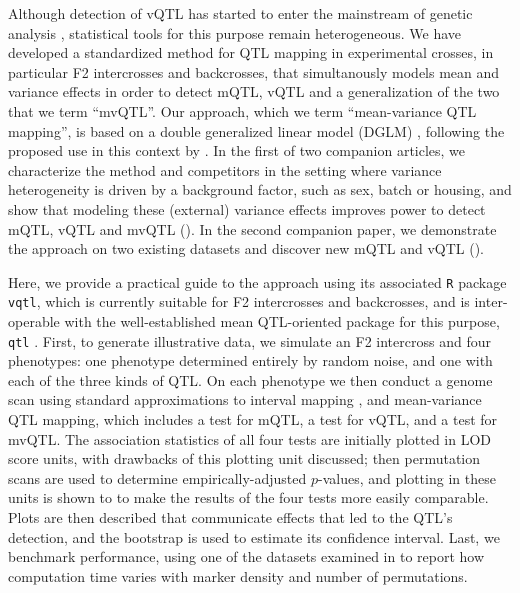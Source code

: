 \documentclass[9pt,twocolumn,twoside]{gsag3jnl}
\begin{document}
Although detection of vQTL has started to enter the mainstream of genetic analysis \citep{Yang2012,Hulse2013,Ayroles2015,Forsberg2015,Wei2016-lt,Wang2017,Wei2017-tt}, statistical tools for this purpose remain heterogeneous.
We have developed a standardized method for QTL mapping in experimental crosses, in particular F2 intercrosses and backcrosses, that simultanously models mean and variance effects in order to detect mQTL, vQTL and a generalization of the two that we term ``mvQTL''.
Our approach, which we term ``mean-variance QTL mapping'', is based on a double generalized linear model (DGLM) \citep{Smyth1989}, following the proposed use in this context by \citet{Ronnegard2011a}.
In the first of two companion articles, we characterize the method and competitors in the setting where variance heterogeneity is driven by a background factor, such as sex, batch or housing, and show that modeling these (external) variance effects improves power to detect mQTL, vQTL and mvQTL (\CortyMethodsPaper). 
In the second companion paper, we demonstrate the approach on two existing datasets and discover new mQTL and vQTL (\CortyReanalysisPaper). 

Here, we provide a practical guide to the approach using its associated \texttt{R} package \texttt{vqtl},
%
%
which is currently suitable for F2 intercrosses and backcrosses, and is inter-operable with the well-established mean QTL-oriented package for this purpose, \texttt{qtl} \citep{Broman2003}.
First, to generate illustrative data, we simulate an F2 intercross and four phenotypes: one phenotype determined entirely by random noise, and one with each of the three kinds of QTL.
On each phenotype we then conduct a genome scan using standard approximations to interval mapping \citep{Lander1989a,Martinez1992}, and mean-variance QTL mapping, which includes a test for mQTL, a test for vQTL, and a test for mvQTL.
The association statistics of all four tests are initially plotted in LOD score units, with drawbacks of this plotting unit discussed; then permutation scans are used to determine empirically-adjusted $p$-values, and plotting in these units is shown to to make the results of the four tests more easily comparable.
Plots are then described that communicate effects that led to the QTL's detection, and the bootstrap is used to estimate its confidence interval.
Last, we benchmark performance, using one of the datasets examined in \CortyReanalysisPaper to report how computation time varies with marker density and number of permutations.
\end{document}
